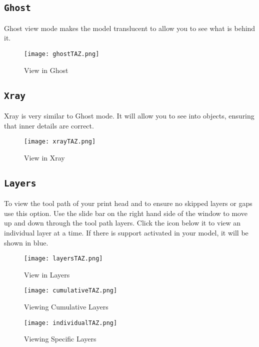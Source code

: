 \subsection{\texttt{Ghost}}
Ghost view mode makes the model translucent to allow you to see what is behind it.
\begin{figure}[H]
\centering
\texttt{[image: ghostTAZ.png]}
\caption{View in Ghost}
\label{fig:Ghost View}
\end{figure}

\subsection{\texttt{Xray}}
Xray is very similar to Ghost mode. It will allow you to see into objects, ensuring that inner details are correct.
\begin{figure}[H]
\centering
\texttt{[image: xrayTAZ.png]}
\caption{View in Xray}
\label{fig:Xray View}
\end{figure}

\subsection{\texttt{Layers}}
To view the tool path of your print head and to ensure no skipped layers or gaps use this option. Use the slide bar on the right hand side of the window to move up and down through the tool path layers. Click the icon below it to view an individual layer at a time. If there is support activated in your model, it will be shown in blue.
\begin{figure}[H]
\centering
\texttt{[image: layersTAZ.png]}
\caption{View in Layers}
\label{fig:Layers View}
\end{figure}

\begin{figure}[H]
\centering
\texttt{[image: cumulativeTAZ.png]}
\caption{Viewing Cumulative Layers}
\label{fig:Mid Layers View}
\end{figure}

\begin{figure}[H]
\centering
\texttt{[image: individualTAZ.png]}
\caption{Viewing Specific Layers}
\label{fig:Viewing Specific Layer}
\end{figure}


